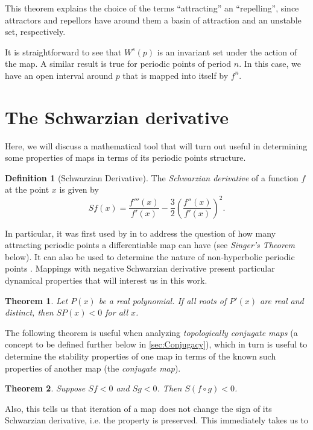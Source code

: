 \documentclass[10pt,twoside,titlepage]{book}
\numberwithin{equation}{chapter}
\numberwithin{figure}{chapter}
\numberwithin{table}{chapter}
\theoremstyle{plain}%
\newtheorem{thm}{Theorem}[chapter]
\theoremstyle{definition}
\newtheorem{defn}{Definition}[chapter]
\theoremstyle{remark}
\begin{document}
This theorem explains the choice of the terms ``attracting'' an ``repelling'', since attractors and repellors have around them a basin of attraction and an unstable set, respectively.

It is straightforward to see that $W^s(p)$ is an invariant set under the action of the map. A similar result is true for periodic points of period $n$. In this case, we have an open interval around $p$ that is mapped into itself by $f^{n}$.

\section{The Schwarzian derivative}
\label{sec:SchwarzianDerivative}

Here, we will discuss a mathematical tool that will turn out useful in determining some properties of maps in terms of its periodic points structure.

\begin{defn}[Schwarzian Derivative]
	The \emph{Schwarzian derivative} of a function $f$ at the point $x$ is given by
	\[Sf(x)=\frac{f'''(x)}{f'(x)}-\frac{3}{2}\left(\frac{f''(x)}{f'(x)}\right)^{2}.\]
\end{defn}

In particular, it was first used by \cite{Singer} in \cite{Singer} to address the question of how many attracting periodic points a differentiable map can have \cite{Singer} (see \emph{Singer's Theorem} below). It can also be used to determine the nature of non-hyperbolic periodic points \cite{Elaydi}. Mappings with negative Schwarzian derivative present particular dynamical properties that will interest us in this work.

\begin{thm}
	Let $P(x)$ be a real polynomial. If all roots of $P'(x)$ are real and distinct, then $SP(x)<0$ for all $x$.
\end{thm}

The following theorem is useful when analyzing \emph{topologically conjugate maps} (a concept to be defined further below in \ref{sec:Conjugacy}), which in turn is useful to determine the stability properties of one map in terms of the known such properties of another map (the \emph{conjugate map}).

\begin{thm}
	Suppose $Sf<0$ and $Sg<0$. Then $S(f\circ g)<0$.
\end{thm}

Also, this tells us that iteration of a map does not change the sign of its Schwarzian derivative, i.e. the property is preserved. This immediately takes us to
\end{document}
